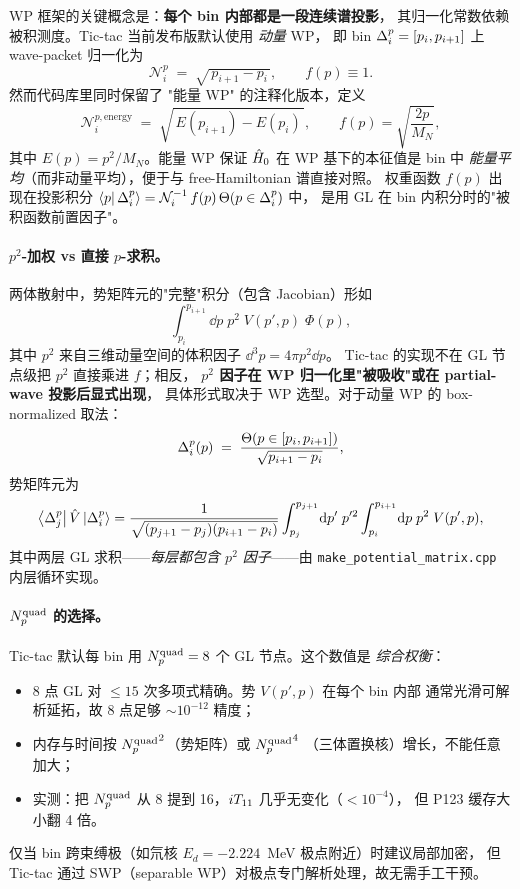 WP 框架的关键概念是：\textbf{每个 bin 内部都是一段连续谱投影}，
其归一化常数依赖被积测度。Tic-tac 当前发布版默认使用 \emph{动量} WP，
即 bin $\Delta_{i}^{p}=[p_i,p_{i+1}]$ 上 wave-packet 归一化为
\begin{equation}
  \mathcal{N}_i^{p} \;=\; \sqrt{\,p_{i+1}-p_i\,}, \qquad
  f(p)\equiv 1.
\end{equation}
然而代码库里同时保留了 "能量 WP" 的注释化版本，定义
\begin{equation}
  \mathcal{N}_i^{p,\text{energy}} \;=\; \sqrt{\,E(p_{i+1})-E(p_i)\,},\qquad
  f(p) = \sqrt{\frac{2p}{M_N}},
\end{equation}
其中 $E(p)=p^{2}/M_N$。能量 WP 保证 $\hat{H}_0$ 在 WP 基下的本征值是 bin 中
\emph{能量平均}（而非动量平均），便于与 free-Hamiltonian 谱直接对照。
权重函数 $f(p)$ 出现在投影积分
$\bra{p}\Delta_{i}^{p}\rangle = \mathcal{N}_i^{-1}\,f(p)\,\Theta(p\in\Delta_{i}^{p})$ 中，
是用 GL 在 bin 内积分时的"被积函数前置因子"。

\paragraph{$p^{2}$-加权 vs 直接 $p$-求积。}
两体散射中，势矩阵元的"完整"积分（包含 Jacobian）形如
\begin{equation}
  \int_{p_i}^{p_{i+1}}\dd p\;p^{2}\;V(p',p)\;\Phi(p),
\end{equation}
其中 $p^{2}$ 来自三维动量空间的体积因子 $\dd^{3}p=4\pi p^{2}\dd p$。
Tic-tac 的实现不在 GL 节点级把 $p^{2}$ 直接乘进 $f$；相反，
\textbf{$p^{2}$ 因子在 WP 归一化里"被吸收"或在 partial-wave 投影后显式出现}，
具体形式取决于 WP 选型。对于动量 WP 的 box-normalized 取法：
\begin{equation}
  \Delta_{i}^{p}(p) \;=\; \frac{\Theta(p\in[p_i,p_{i+1}])}{\sqrt{p_{i+1}-p_i}},
\end{equation}
势矩阵元为
\begin{equation}
  \bra{\Delta_{j}^{p}}\hat{V}\ket{\Delta_{i}^{p}}
  = \frac{1}{\sqrt{(p_{j+1}-p_j)(p_{i+1}-p_i)}}
  \int_{p_j}^{p_{j+1}}\!\dd p'\;p'^{2}
  \int_{p_i}^{p_{i+1}}\!\dd p\;p^{2}\;V(p',p),
\end{equation}
其中两层 GL 求积——\emph{每层都包含 $p^{2}$ 因子}——由
\texttt{make\_potential\_matrix.cpp} 内层循环实现。

\paragraph{${N_{p}^{\text{quad}}}$ 的选择。}
Tic-tac 默认每 bin 用 ${N_{p}^{\text{quad}}}=8$ 个 GL 节点。这个数值是 \emph{综合权衡}：
\begin{itemize}
\item 8 点 GL 对 $\le 15$ 次多项式精确。势 $V(p',p)$ 在每个 bin 内部
      通常光滑可解析延拓，故 8 点足够 $\sim 10^{-12}$ 精度；
\item 内存与时间按 ${N_{p}^{\text{quad}}}^{2}$（势矩阵）或 ${N_{p}^{\text{quad}}}^{4}$
      （三体置换核）增长，不能任意加大；
\item 实测：把 ${N_{p}^{\text{quad}}}$ 从 8 提到 16，${i T_{11}}$ 几乎无变化（$<10^{-4}$），
      但 P123 缓存大小翻 4 倍。
\end{itemize}
仅当 bin 跨束缚极（如氘核 $E_d=-2.224$~MeV 极点附近）时建议局部加密，
但 Tic-tac 通过 SWP（separable WP）对极点专门解析处理，故无需手工干预。

